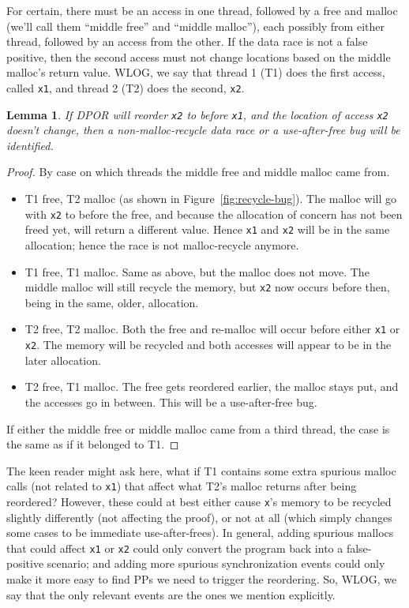 \documentclass[pldi]{sigplanconf-pldi15}
\newtheorem{lemma}{Lemma}
\begin{document}
For certain, there must be an access in one thread, followed by a free and malloc (we'll call them ``middle free'' and ``middle malloc''), each possibly from either thread, followed by an access from the other.
If the data race is not a false positive, then the second access must not change locations based on the middle malloc's return value.
WLOG, we say that thread 1 (T1) does the first access, called {\tt x1}, and thread 2 (T2) does the second, {\tt x2}.

\begin{lemma}
	If DPOR will reorder {\tt x2} to before {\tt x1}, and the location of access {\tt x2} doesn't change,
	then a non-malloc-recycle data race or a use-after-free bug will be identified.
	\label{lem:reorder}
\end{lemma}
\begin{proof}
By case on which threads the middle free and middle malloc came from.
\begin{itemize}
	\item T1 free, T2 malloc (as shown in Figure~\ref{fig:recycle-bug}). The malloc will go with {\tt x2} to before the free, and because the allocation of concern has not been freed yet, will return a different value. Hence {\tt x1} and {\tt x2} will be in the same allocation; hence the race is not malloc-recycle anymore.
	\item T1 free, T1 malloc. Same as above, but the malloc does not move. The middle malloc will still recycle the memory, but {\tt x2} now occurs before then, being in the same, older, allocation.
	\item T2 free, T2 malloc. Both the free and re-malloc will occur before either {\tt x1} or {\tt x2}. The memory will be recycled and both accesses will appear to be in the later allocation.
	\item T2 free, T1 malloc. The free gets reordered earlier, the malloc stays put, and the accesses go in between. This will be a use-after-free bug.
\end{itemize}
If either the middle free or middle malloc came from a third thread, the case is the same as if it belonged to T1.
\end{proof}

The keen reader might ask here, what if T1 contains some extra spurious malloc calls (not related to {\tt x1}) that affect what T2's malloc returns after being reordered?
However, these could at best either cause {\tt x}'s memory to be recycled slightly differently (not affecting the proof), or not at all (which simply changes some cases to be immediate use-after-frees).
In general, adding spurious mallocs that could affect {\tt x1} or {\tt x2} could only convert the program back into a false-positive scenario;
and adding more spurious synchronization events could only make it more easy to find PPs we need to trigger the reordering.
So, WLOG, we say that the only relevant events are the ones we mention explicitly.
\end{document}
